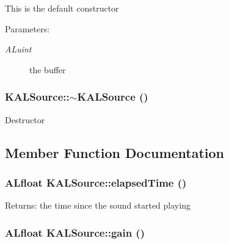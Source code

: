 This is the default constructor \begin{Desc}
\item[Parameters:]
\begin{description}
\item[{\em ALuint}]the buffer \end{description}
\end{Desc}
\hypertarget{class_k_a_l_source_668303aa25ec096eb945381a341bf16c}{
\subsubsection[{$\sim$KALSource}]{\setlength{\rightskip}{0pt plus 5cm}KALSource::$\sim$KALSource ()}}
\label{class_k_a_l_source_668303aa25ec096eb945381a341bf16c}


Destructor 

\subsection{Member Function Documentation}
\hypertarget{class_k_a_l_source_d408e9043f8ba7b87125b46ef9d99067}{
\subsubsection[{elapsedTime}]{\setlength{\rightskip}{0pt plus 5cm}ALfloat KALSource::elapsedTime ()}}
\label{class_k_a_l_source_d408e9043f8ba7b87125b46ef9d99067}


\begin{Desc}
\item[Returns:]the time since the sound started playing \end{Desc}
\hypertarget{class_k_a_l_source_f29819a83267c47424a4f3fab8281a41}{
\subsubsection[{gain}]{\setlength{\rightskip}{0pt plus 5cm}ALfloat KALSource::gain ()}}
\label{class_k_a_l_source_f29819a83267c47424a4f3fab8281a41}


